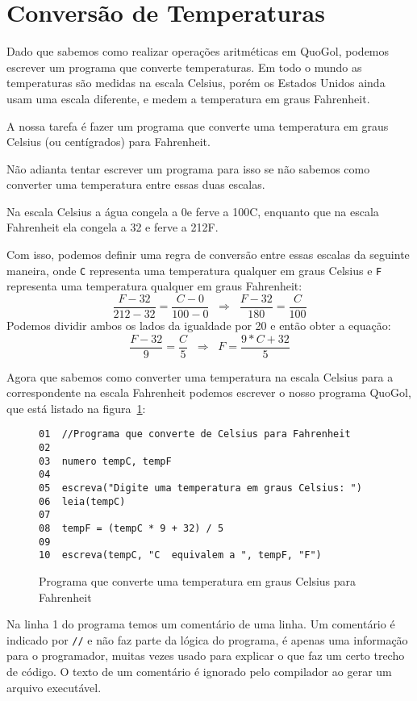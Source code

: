 \documentclass{report}
\newcommand{\Qgol}{QuoGol\;}
\begin{document}
\section{Conversão de Temperaturas}

Dado que sabemos como realizar operações aritméticas em \Qgol,
podemos escrever um programa que converte temperaturas. Em todo o
mundo as temperaturas são medidas na escala Celsius, porém os
Estados Unidos ainda usam uma escala diferente, e medem a temperatura
em graus Fahrenheit. 

A nossa tarefa é fazer um programa que converte uma temperatura em
graus Celsius (ou centígrados) para Fahrenheit.

Não adianta tentar escrever um programa para isso se não sabemos
como converter uma temperatura entre essas duas escalas.

Na escala Celsius a água congela a 0\degree e ferve a 100\degree C,
enquanto que na escala Fahrenheit ela congela a 32\degree
e ferve a 212\degree F.

Com isso, podemos definir uma regra de conversão entre essas escalas
da seguinte maneira, onde \texttt{C} representa uma temperatura qualquer
em graus Celsius e \texttt{F} representa uma temperatura qualquer em
graus Fahrenheit:
\[
\frac{F-32}{212-32} = \frac{C-0}{100-0}  \;\;\Rightarrow\;\;  \frac{F-32}{180}  =  \frac{C}{100}
\]
Podemos dividir ambos os lados da igualdade por 20 e então obter a equação:
\[
\frac{F-32}{9} = \frac{C}{5}  \;\;\Rightarrow\;\;  F = \frac{9*C + 32}{5}
\]

Agora que sabemos como converter uma temperatura na escala Celsius para a
correspondente na escala Fahrenheit podemos escrever o nosso programa \Qgol,
que está listado na figura~\ref{fig:celsius}:

\begin{figure}
\begin{verbatim}
01  //Programa que converte de Celsius para Fahrenheit
02
03  numero tempC, tempF
04
05  escreva("Digite uma temperatura em graus Celsius: ")
06  leia(tempC)
07
08  tempF = (tempC * 9 + 32) / 5
09
10  escreva(tempC, "C  equivalem a ", tempF, "F")
\end{verbatim}
\caption{Programa que converte uma temperatura em graus Celsius para Fahrenheit}
\label{fig:celsius}
\end{figure}

Na linha 1 do programa temos um comentário de uma linha. Um comentário é indicado
por \texttt{//} e não faz parte da lógica do programa, é apenas uma informação para
o programador, muitas vezes usado para explicar o que faz um certo trecho de código.
O texto de um comentário é ignorado pelo compilador ao gerar um arquivo executável.
\end{document}
